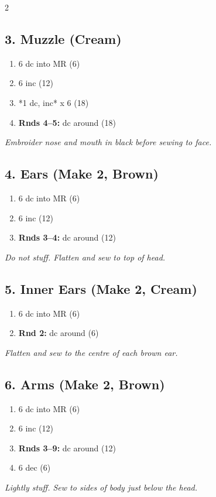\begin{multicols}{2}
\subsection*{3. Muzzle (Cream)}
\begin{enumerate}[noitemsep,leftmargin=*]
    \item 6 dc into MR (6)
    \item 6 inc (12)
    \item *1 dc, inc* x 6 (18)
    \item \textbf{Rnds 4--5:} dc around (18)
\end{enumerate}
\textit{Embroider nose and mouth in black before sewing to face.}

\subsection*{4. Ears (Make 2, Brown)}
\begin{enumerate}[noitemsep,leftmargin=*]
    \item 6 dc into MR (6)
    \item 6 inc (12)
    \item \textbf{Rnds 3--4:} dc around (12)
\end{enumerate}
\textit{Do not stuff. Flatten and sew to top of head.}

\subsection*{5. Inner Ears (Make 2, Cream)}
\begin{enumerate}[noitemsep,leftmargin=*]
    \item 6 dc into MR (6)
    \item \textbf{Rnd 2:} dc around (6)
\end{enumerate}
\textit{Flatten and sew to the centre of each brown ear.}

\subsection*{6. Arms (Make 2, Brown)}
\begin{enumerate}[noitemsep,leftmargin=*]
    \item 6 dc into MR (6)
    \item 6 inc (12)
    \item \textbf{Rnds 3--9:} dc around (12)
    \item 6 dec (6)
\end{enumerate}
\textit{Lightly stuff. Sew to sides of body just below the head.}


\end{multicols}
